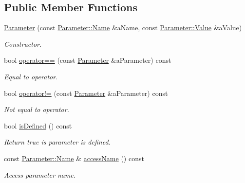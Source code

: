\subsection*{Public Member Functions}
\begin{DoxyCompactItemize}
\item 
\hyperlink{classostk_1_1io_1_1url_1_1_query_1_1_parameter_a0206a88a6546df8ec49219db4a8db3f3}{Parameter} (const \hyperlink{classostk_1_1io_1_1url_1_1_query_1_1_parameter_ad176899a3555e0d0efeb0c13f73a8a80}{Parameter\+::\+Name} \&a\+Name, const \hyperlink{classostk_1_1io_1_1url_1_1_query_1_1_parameter_ada177e3a9d839a7900aae8a718207bbd}{Parameter\+::\+Value} \&a\+Value)
\begin{DoxyCompactList}\small\item\em Constructor. \end{DoxyCompactList}\item 
bool \hyperlink{classostk_1_1io_1_1url_1_1_query_1_1_parameter_a2ff2a7edfc87748ab3fae225b4462a1d}{operator==} (const \hyperlink{classostk_1_1io_1_1url_1_1_query_1_1_parameter}{Parameter} \&a\+Parameter) const
\begin{DoxyCompactList}\small\item\em Equal to operator. \end{DoxyCompactList}\item 
bool \hyperlink{classostk_1_1io_1_1url_1_1_query_1_1_parameter_a0e272f97e1f7cefee01a2d8f1af76481}{operator!=} (const \hyperlink{classostk_1_1io_1_1url_1_1_query_1_1_parameter}{Parameter} \&a\+Parameter) const
\begin{DoxyCompactList}\small\item\em Not equal to operator. \end{DoxyCompactList}\item 
bool \hyperlink{classostk_1_1io_1_1url_1_1_query_1_1_parameter_ad4de58e0e1efbe7dd781caecf6b98163}{is\+Defined} () const
\begin{DoxyCompactList}\small\item\em Return true is parameter is defined. \end{DoxyCompactList}\item 
const \hyperlink{classostk_1_1io_1_1url_1_1_query_1_1_parameter_ad176899a3555e0d0efeb0c13f73a8a80}{Parameter\+::\+Name} \& \hyperlink{classostk_1_1io_1_1url_1_1_query_1_1_parameter_a63d4ad35531e2ee58a6156951d323c76}{access\+Name} () const
\begin{DoxyCompactList}\small\item\em Access parameter name. \end{DoxyCompactList}\item 

\end{DoxyCompactItemize}
